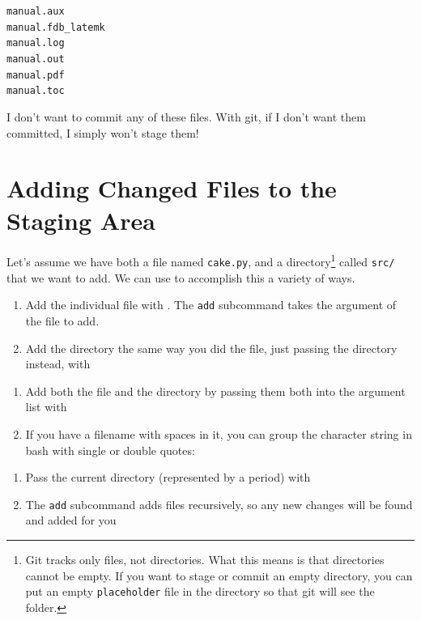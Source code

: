 \documentclass[11pt,letterpaper,twoside]{report}
\begin{document}
\begin{multicols}{3}
\noindent
\texttt{manual.aux}\\
\texttt{manual.fdb\_latemk}\\
\texttt{manual.log}\\
\texttt{manual.out}\\
\texttt{manual.pdf}\\
\texttt{manual.toc}
\end{multicols}

I don't want to commit any of these files. With git, if I don't want them
committed, I simply won't stage them!

\section{Adding Changed Files to the Staging Area}
Let's assume we have both a file named \texttt{cake.py}, and a
directory\footnote{Git tracks only files, not directories. What this means is
that directories cannot be empty. If you want to stage or commit an empty
directory, you can put an empty \texttt{placeholder} file in the directory so
that git will see the folder.} called \texttt{src/} that we want to add. We can
use  to accomplish this a variety of ways.

\vspace{.5em}\noindent
{}
\begin{enumerate}
\item Add the individual file with . The \texttt{add}
    subcommand takes the argument of the file to add.
\item Add the directory the same way you did the file, just passing the
    directory instead, with 
\end{enumerate}

\noindent
{}
\begin{enumerate}
\item Add both the file and the directory by passing them both into the argument
    list with 
\item If you have a filename with spaces in it, you can group the character
    string in bash with single or double quotes:
\end{enumerate}

\noindent
{}
\begin{enumerate}
\item Pass the current directory (represented by a period) with
\item The \texttt{add} subcommand adds files recursively, so any new changes
    will be found and added for you
\end{enumerate}
\end{document}
